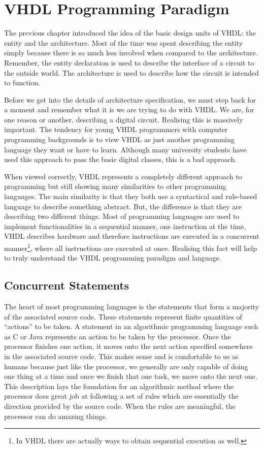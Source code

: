 %
%
%
\chapter{VHDL Programming Paradigm}
The previous chapter introduced the idea of the basic design units of VHDL: the entity and the architecture. Most of the time was spent describing the entity simply because there is so much less involved when compared to the architecture. Remember, the entity declaration is used to describe the interface of a circuit to the outside world. The architecture is used to describe how the circuit is intended to function.

Before we get into the details of architecture specification, we must step back for a moment and remember what it is we are trying to do with VHDL. We are, for one reason or another, describing a digital circuit. Realising this is massively important. The tendency for young VHDL programmers with computer programming backgrounds is to view VHDL as just another programming language they want or have to learn. Although many university students have used this approach to pass the basic digital classes, this is a bad approach. 

When viewed correctly, VHDL represents a completely different approach to programming but still showing many similarities to other programming languages. The main similarity is that they both use a syntactical and rule-based language to describe something abstract. But, the difference is that they are describing two different things. Most of programming languages are used to implement functionalities in a sequential manner, one instruction at the time, VHDL describes hardware and therefore instructions are executed in a concurrent manner\footnote{In VHDL there are actually ways to obtain sequential execution as well.}, where all instructions are executed at once. Realising this fact will help to truly understand the VHDL programming paradigm and language.

\section{Concurrent Statements}
The heart of most programming languages is the statements that form a majority of the associated source code. These statements represent finite quantities of ``actions'' to be taken. A statement in an algorithmic programming language such as C or Java represents an action to be taken by the processor. Once the processor finishes one action, it moves onto the next action specified somewhere in the associated source code. This makes sense and is comfortable to us as humans because just like the processor, we generally are only capable of doing one thing at a time and once we finish that one task, we move onto the next one. This description lays the foundation for an algorithmic method where the processor does great job at following a set of rules which are essentially the direction provided by the source code. When the rules are meaningful, the processor can do amazing things. 


